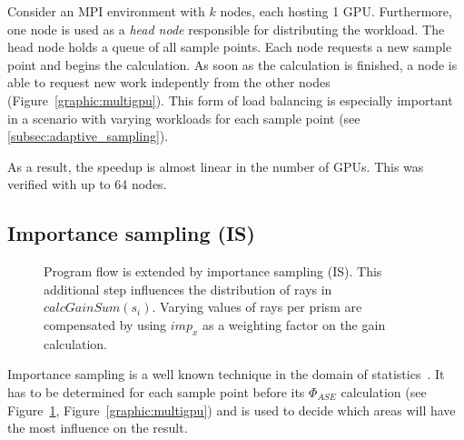 Consider an MPI\cite{MPI} environment with $k$ nodes, each hosting 1
GPU\@. Furthermore, one node is used as a \emph{head node} responsible
for distributing the workload. The head node holds a queue of all
sample points. Each node requests a new sample point and begins the
calculation. As soon as the calculation is finished, a node is able to
request new work indepently from the other nodes
(Figure~\ref{graphic:multigpu}). This form of load balancing is
especially important in a scenario with varying workloads for each
sample point (see \cref{subsec:adaptive_sampling}).

As a result, the speedup is almost linear in the number of GPUs. This
was verified with up to 64 nodes.
    
\subsection{Importance sampling (IS)}
\label{subsec:importance_sampling}
\begin{figure}[H]
  \centerline
      {}
  \caption{Program flow is extended by importance sampling (IS). This
    additional step influences the distribution of rays in
    $calcGainSum(s_i)$. Varying values of rays per prism are
    compensated by using $imp_x$ as a weighting factor on the gain
    calculation.}
  \label{graphic:pap2}
\end{figure}
Importance sampling is a well known technique in the domain of
statistics~\cite{importanceSamplingSource}. It has to be determined
for each sample point before its $\Phi_{ASE}$ calculation (see
Figure~\ref{graphic:pap2}, Figure~\ref{graphic:multigpu}) and is used
to decide which areas will have the most influence on the result.

